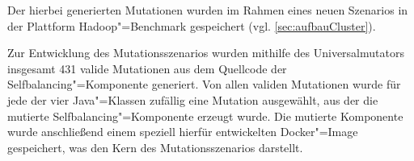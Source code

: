 Der hierbei generierten Mutationen wurden im Rahmen eines neuen Szenarios in der Plattform Hadoop"=Benchmark gespeichert (vgl. \autoref{sec:aufbauCluster}).

Zur Entwicklung des Mutationsszenarios wurden mithilfe des Universalmutators insgesamt 431 valide Mutationen aus dem Quellcode der Selfbalancing"=Komponente generiert.
Von allen validen Mutationen wurde für jede der vier Java"=Klassen zufällig eine Mutation ausgewählt, aus der die mutierte Selfbalancing"=Komponente erzeugt wurde.
Die mutierte Komponente wurde anschließend einem speziell hierfür entwickelten Docker"=Image gespeichert, was den Kern des Mutationsszenarios darstellt.

